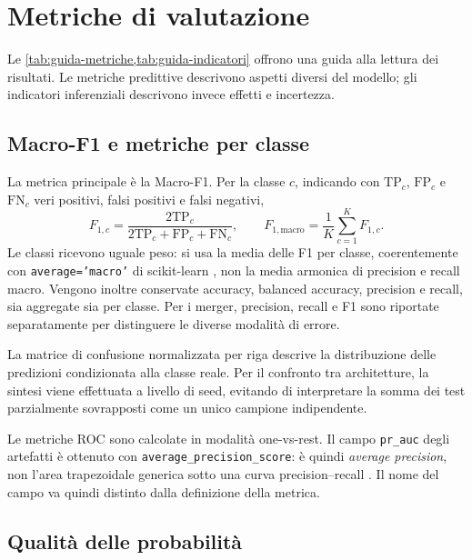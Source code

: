 \section{Metriche di valutazione}
\label{sec:metriche}

Le \cref{tab:guida-metriche,tab:guida-indicatori} offrono
una guida alla lettura dei risultati. Le metriche predittive
descrivono aspetti diversi del modello; gli indicatori
inferenziali descrivono invece effetti e incertezza.



\subsection{Macro-F1 e metriche per classe}

La metrica principale è la Macro-F1. Per la classe \(c\), indicando con
\(\mathrm{TP}_c\), \(\mathrm{FP}_c\) e \(\mathrm{FN}_c\) veri positivi,
falsi positivi e falsi negativi,
\begin{equation}
 F_{1,c}=\frac{2\mathrm{TP}_c}
 {2\mathrm{TP}_c+\mathrm{FP}_c+\mathrm{FN}_c},
 \qquad
 F_{1,\mathrm{macro}}=\frac{1}{K}\sum_{c=1}^{K}F_{1,c}.
\end{equation}
Le classi ricevono uguale peso: si usa la media delle F1 per classe,
coerentemente con \texttt{average='macro'} di scikit-learn
\cite{sklearn17f1}, non la media armonica di precision e recall macro.
Vengono inoltre conservate accuracy,
balanced accuracy, precision e recall, sia aggregate sia per classe.
Per i merger, precision, recall e F1 sono riportate separatamente
per distinguere le diverse modalità di errore.

La matrice di confusione normalizzata per riga descrive la distribuzione
delle predizioni condizionata alla classe reale. Per il confronto tra
architetture, la sintesi viene effettuata a livello di seed, evitando
di interpretare la somma dei test parzialmente sovrapposti come un
unico campione indipendente.

Le metriche ROC sono calcolate in modalità one-vs-rest. Il campo
\texttt{pr\_auc} degli artefatti è ottenuto con
\texttt{average\_precision\_score}: è quindi \emph{average precision},
non l'area trapezoidale generica sotto una curva precision--recall
\cite{sklearn17averageprecision}.
Il nome del campo va quindi distinto dalla definizione della metrica.

\subsection{Qualità delle probabilità}

